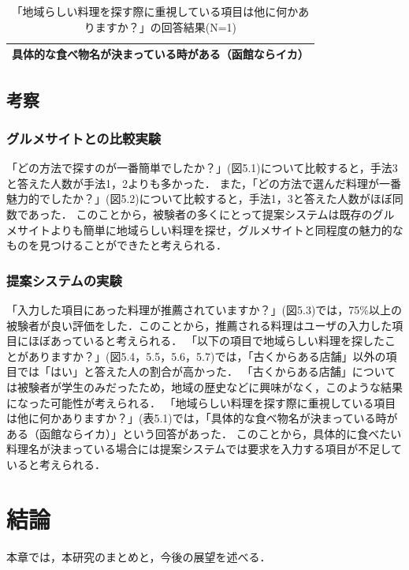 \documentclass{funthesis}
\begin{document}
\begin{table}[htb]
  \begin{center}
  \scriptsize
    \caption[「地域らしい料理を探す際に重視している項目は他に何かありますか？」の回答結果]{「地域らしい料理を探す際に重視している項目は他に何かありますか？」の回答結果(N=1)}
    \normalsize
   \begin{tabular}{p{13cm}}
    \hline
 具体的な食べ物名が決まっている時がある（函館ならイカ）\\ \hline
  \end{tabular}
  \end{center}
\end{table}

\section{考察}
\subsection{グルメサイトとの比較実験}
「どの方法で探すのが一番簡単でしたか？」(図5.1)について比較すると，手法3と答えた人数が手法1，2よりも多かった．
また，「どの方法で選んだ料理が一番魅力的でしたか？」(図5.2)について比較すると，手法1，3と答えた人数がほぼ同数であった．
このことから，被験者の多くにとって提案システムは既存のグルメサイトよりも簡単に地域らしい料理を探せ，グルメサイトと同程度の魅力的なものを見つけることができたと考えられる．

\subsection{提案システムの実験}
「入力した項目にあった料理が推薦されていますか？」(図5.3)では，75\%以上の被験者が良い評価をした．このことから，推薦される料理はユーザの入力した項目にほぼあっていると考えられる．
「以下の項目で地域らしい料理を探したことがありますか？」(図5.4，5.5，5.6，5.7)では，「古くからある店舗」以外の項目では「はい」と答えた人の割合が高かった．
「古くからある店舗」については被験者が学生のみだったため，地域の歴史などに興味がなく，このような結果になった可能性が考えられる．
「地域らしい料理を探す際に重視している項目は他に何かありますか？」(表5.1)では，「具体的な食べ物名が決まっている時がある（函館ならイカ）」という回答があった．
このことから，具体的に食べたい料理名が決まっている場合には提案システムでは要求を入力する項目が不足していると考えられる．

\chapter{結論}
本章では，本研究のまとめと，今後の展望を述べる．
\end{document}
